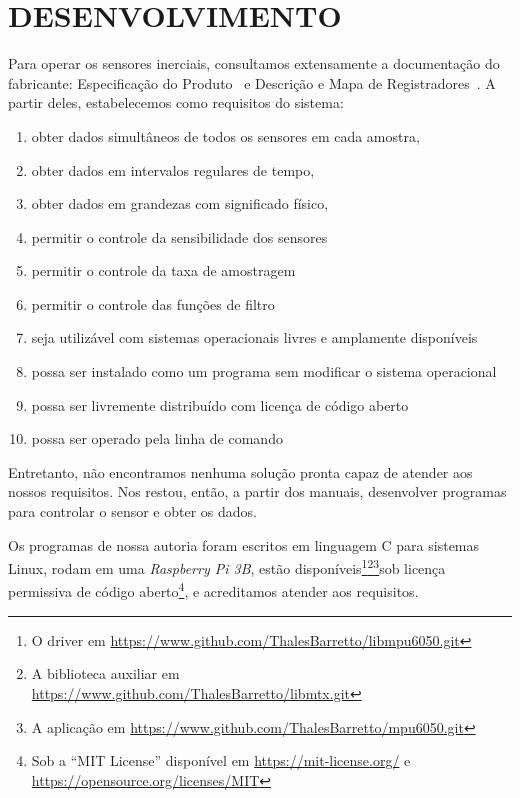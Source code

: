 \chapter{DESENVOLVIMENTO}\label{chap:desenvolvimento}

Para operar os sensores inerciais, consultamos extensamente a documentação do fabricante: Especificação do Produto~\cite{mpu6050ps} e Descrição e Mapa de Registradores~\cite{mpu6050rm}.
A partir deles, estabelecemos como requisitos do sistema:
\begin{enumerate}
        \item obter dados simultâneos de todos os sensores em cada amostra,
        \item obter dados em intervalos regulares de tempo,
        \item obter dados em grandezas com significado físico,
        \item permitir o controle da sensibilidade dos sensores
        \item permitir o controle da taxa de amostragem
        \item permitir o controle das funções de filtro
        \item seja utilizável com sistemas operacionais livres e amplamente disponíveis
        \item possa ser instalado como um programa sem modificar o sistema operacional
        \item possa ser livremente distribuído com licença de código aberto
        \item possa ser operado pela linha de comando
\end{enumerate}

Entretanto, não encontramos nenhuma solução pronta capaz de atender aos nossos requisitos. Nos restou, então, a partir dos manuais, desenvolver programas para controlar o sensor e obter os dados.

Os programas de nossa autoria foram escritos em linguagem C para sistemas Linux, rodam em uma \emph{Raspberry Pi 3B}, estão disponíveis\footnote{O driver em \href{https://www.github.com/ThalesBarretto/libmpu6050.git}{https://www.github.com/ThalesBarretto/libmpu6050.git}}\footnote{A biblioteca auxiliar em \href{https://www.github.com/ThalesBarretto/libmtx.git}{https://www.github.com/ThalesBarretto/libmtx.git}}\footnote{A aplicação em \href{https://www.github.com/ThalesBarretto/mpu6050.git}{https://www.github.com/ThalesBarretto/mpu6050.git}}sob licença permissiva de código aberto\footnote{Sob a ``MIT License'' disponível em \href{https://mit-license.org/}{https://mit-license.org/} e \href{https://opensource.org/licenses/MIT}{https://opensource.org/licenses/MIT}}, e acreditamos atender aos requisitos.

